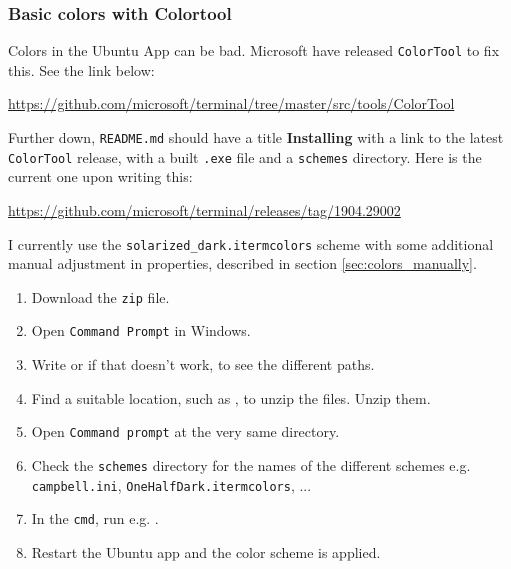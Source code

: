 \subsubsection{Basic colors with Colortool}\label{sec:color_basic}
Colors in the Ubuntu App can be bad. Microsoft have released \texttt{ColorTool} to fix this. See the link below:

\url{https://github.com/microsoft/terminal/tree/master/src/tools/ColorTool}

Further down, \texttt{README.md} should have a title \textbf{Installing} with a link to the latest \texttt{ColorTool} release, with a built \texttt{.exe} file and a \texttt{schemes} directory. Here is the current one upon writing this:

\url{https://github.com/microsoft/terminal/releases/tag/1904.29002}

I currently use the \texttt{solarized\_dark.itermcolors} scheme with some additional manual adjustment in properties, described in section \ref{sec:colors_manually}.

\begin{enumerate}
    \item Download the \texttt{zip} file.
    \item Open \texttt{Command Prompt} in Windows.
    \item Write  or  if that doesn't work, to see the different paths.
    \item Find a suitable location, such as , to unzip the files. Unzip them.
    \item Open \texttt{Command prompt} at the very same directory.
    \item Check the \texttt{schemes} directory for the names of the different schemes e.g. \texttt{campbell.ini}, \texttt{OneHalfDark.itermcolors}, ...
    \item In the \texttt{cmd}, run  e.g. .
    \item Restart the Ubuntu app and the color scheme is applied.
\end{enumerate}

